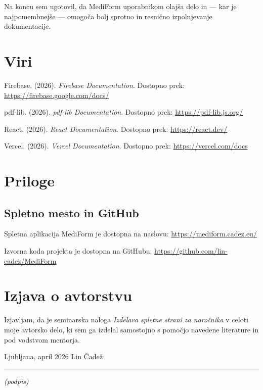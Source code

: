 \documentclass[12pt,a4paper]{article}
\begin{document}
Na koncu sem ugotovil, da MediForm uporabnikom olaj\v{s}a delo in --- kar je najpomembnej\v{s}e --- omogo\v{c}a bolj sprotno in resni\v{c}no izpolnjevanje dokumentacije.

\newpage

\section*{Viri}

Firebase. (2026). \textit{Firebase Documentation}. Dostopno prek: \url{https://firebase.google.com/docs/}

pdf-lib. (2026). \textit{pdf-lib Documentation}. Dostopno prek: \url{https://pdf-lib.js.org/}

React. (2026). \textit{React Documentation}. Dostopno prek: \url{https://react.dev/}

Vercel. (2026). \textit{Vercel Documentation}. Dostopno prek: \url{https://vercel.com/docs}

\newpage

\section*{Priloge}

\subsection*{Spletno mesto in GitHub}

Spletna aplikacija MediForm je dostopna na naslovu: \url{https://mediform.cadez.eu/}

Izvorna koda projekta je dostopna na GitHubu: \url{https://github.com/lin-cadez/MediForm}


\newpage
\thispagestyle{empty}

\section*{Izjava o avtorstvu}

Izjavljam, da je seminarska naloga \textit{Izdelava spletne strani za naro\v{c}nika} v celoti moje avtorsko delo, ki sem ga izdelal samostojno s pomo\v{c}jo navedene literature in pod vodstvom mentorja.

\vspace{2cm}

Ljubljana, april 2026 \hfill Lin \v{C}ade\v{z}

\vspace{1.5cm}
\hfill \rule{6cm}{0.4pt}

\hfill \textit{(podpis)}
\end{document}
